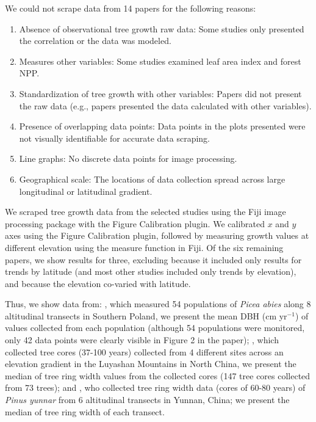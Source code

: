 \documentclass[11pt]{article}
\begin{document}
We could not scrape data from 14 papers for the following reasons: 
\begin{enumerate}
\item Absence of observational tree growth raw data: Some studies only presented the correlation or the data was modeled. 
\item  Measures other variables: Some studies examined leaf area index and forest NPP. 
\item  Standardization of tree growth with other variables: Papers did not present the raw data (e.g., papers presented the data calculated with other variables).
\item  Presence of overlapping data points: Data points in the plots presented were not visually identifiable for accurate data scraping.
\item Line graphs: No discrete data points for image processing. 
\item Geographical scale: The locations of data collection spread across large longitudinal or latitudinal gradient. 
\end{enumerate}

We scraped tree growth data from the selected studies using the Fiji image processing package with the Figure Calibration plugin. We calibrated $x$ and $y$ axes using the Figure Calibration plugin, followed by measuring growth values at different elevation using the measure function in Fiji. Of the six remaining papers, we show results for three, excluding \cite{huang2010radial} because it included only results for trends by latitude (and most other studies included only trends by elevation), and \cite{cavin2017highest,zhu2018spatial} because the elevation co-varied with latitude. 

Thus, we show data from: \cite{oleksyn1998growth}, which measured 54 populations of  \emph{Picea abies} along 8 altitudinal transects in Southern Poland, we present the mean DBH (cm yr$^{-1}$) of values collected from each population (although 54 populations were monitored, only 42 data points were clearly visible in Figure 2 in the paper); \cite{wang2017climatic}, which collected  tree cores (37-100 years) collected from 4 different sites across an elevation gradient in the Luyashan Mountains in North China, we present the median of tree ring width values from the collected cores (147 tree cores collected from 73 trees); and \cite{zhou2022altitudinal}, who collected tree ring width data (cores of 60-80 years) of \emph{Pinus yunnar} from 6 altitudinal transects in Yunnan, China; we present the median of tree ring width of each transect.
\end{document}
